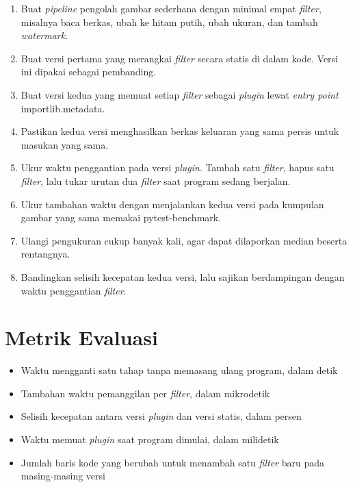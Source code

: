 \documentclass[11pt,a4paper]{article}
\begin{document}
\begin{enumerate}[leftmargin=*]
  \item Buat \textit{pipeline} pengolah gambar sederhana dengan minimal empat \textit{filter}, misalnya baca berkas, ubah ke hitam putih, ubah ukuran, dan tambah \textit{watermark}.
  \item Buat versi pertama yang merangkai \textit{filter} secara statis di dalam kode. Versi ini dipakai sebagai pembanding.
  \item Buat versi kedua yang memuat setiap \textit{filter} sebagai \textit{plugin} lewat \textit{entry point} importlib.metadata.
  \item Pastikan kedua versi menghasilkan berkas keluaran yang sama persis untuk masukan yang sama.
  \item Ukur waktu penggantian pada versi \textit{plugin}. Tambah satu \textit{filter}, hapus satu \textit{filter}, lalu tukar urutan dua \textit{filter} saat program sedang berjalan.
  \item Ukur tambahan waktu dengan menjalankan kedua versi pada kumpulan gambar yang sama memakai pytest-benchmark.
  \item Ulangi pengukuran cukup banyak kali, agar dapat dilaporkan median beserta rentangnya.
  \item Bandingkan selisih kecepatan kedua versi, lalu sajikan berdampingan dengan waktu penggantian \textit{filter}.
\end{enumerate}

\section{Metrik Evaluasi}

\begin{itemize}[leftmargin=*]
  \item Waktu mengganti satu tahap tanpa memasang ulang program, dalam detik
  \item Tambahan waktu pemanggilan per \textit{filter}, dalam mikrodetik
  \item Selisih kecepatan antara versi \textit{plugin} dan versi statis, dalam persen
  \item Waktu memuat \textit{plugin} saat program dimulai, dalam milidetik
  \item Jumlah baris kode yang berubah untuk menambah satu \textit{filter} baru pada masing-masing versi
\end{itemize}



\end{document}
